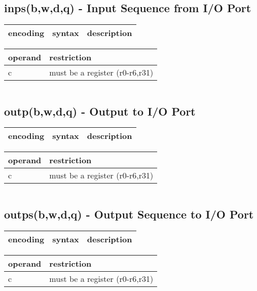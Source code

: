 \documentclass[letterpaper,10pt,openright,twoside,onecolumn]{book}
\begin{document}
\newpage\subsection{inps(b,w,d,q) - Input Sequence from I/O Port}
  \begin{tabular}{|l|l|l|}
   \hline
    encoding & syntax & description \\
   \hline
   \hline
  \end{tabular}
  \flushleft
  \begin{tabular}{|l|l|}
   \hline
    operand & restriction \\
   \hline
    c & must be a register (r0-r6,r31) \\
   \hline
  \end{tabular}
  \begin{verbatim}
  \end{verbatim}
\newpage\subsection{outp(b,w,d,q) - Output to I/O Port}
  \begin{tabular}{|l|l|l|}
   \hline
    encoding & syntax & description \\
   \hline
   \hline
  \end{tabular}
  \flushleft
  \begin{tabular}{|l|l|}
   \hline
    operand & restriction \\
   \hline
    c & must be a register (r0-r6,r31) \\
   \hline
  \end{tabular}
  \begin{verbatim}
  \end{verbatim}
\newpage\subsection{outps(b,w,d,q) - Output Sequence to I/O Port}
  \begin{tabular}{|l|l|l|}
   \hline
    encoding & syntax & description \\
   \hline
   \hline
  \end{tabular}
  \flushleft
  \begin{tabular}{|l|l|}
   \hline
    operand & restriction \\
   \hline
    c & must be a register (r0-r6,r31) \\
   \hline
  \end{tabular}
  \begin{verbatim}
  \end{verbatim}
\end{document}

